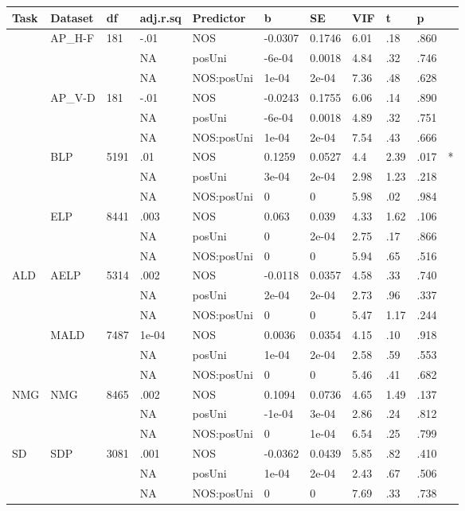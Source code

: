 \begin{table}[ht]
\centering
\begingroup\normalsize
\begin{tabular}{lllllllllll}
  \hline
Task & Dataset & df & adj.r.sq & Predictor & b & SE & VIF & t & p &  \\ 
  \hline
 & AP\_H-F & 181 & -.01 & NOS & -0.0307 & 0.1746 & 6.01 & .18 & .860 &   \\ 
   &  &  & NA & posUni & -6e-04 & 0.0018 & 4.84 & .32 & .746 &   \\ 
   &  &  & NA & NOS:posUni & 1e-04 & 2e-04 & 7.36 & .48 & .628 &   \\ 
   & AP\_V-D & 181 & -.01 & NOS & -0.0243 & 0.1755 & 6.06 & .14 & .890 &   \\ 
   &  &  & NA & posUni & -6e-04 & 0.0018 & 4.89 & .32 & .751 &   \\ 
   &  &  & NA & NOS:posUni & 1e-04 & 2e-04 & 7.54 & .43 & .666 &   \\ 
   & BLP & 5191 & .01 & NOS & 0.1259 & 0.0527 & 4.4 & 2.39 & .017 & * \\ 
   &  &  & NA & posUni & 3e-04 & 2e-04 & 2.98 & 1.23 & .218 &   \\ 
   &  &  & NA & NOS:posUni & 0 & 0 & 5.98 & .02 & .984 &   \\ 
   & ELP & 8441 & .003 & NOS & 0.063 & 0.039 & 4.33 & 1.62 & .106 &   \\ 
   &  &  & NA & posUni & 0 & 2e-04 & 2.75 & .17 & .866 &   \\ 
   &  &  & NA & NOS:posUni & 0 & 0 & 5.94 & .65 & .516 &   \\ 
  ALD & AELP & 5314 & .002 & NOS & -0.0118 & 0.0357 & 4.58 & .33 & .740 &   \\ 
   &  &  & NA & posUni & 2e-04 & 2e-04 & 2.73 & .96 & .337 &   \\ 
   &  &  & NA & NOS:posUni & 0 & 0 & 5.47 & 1.17 & .244 &   \\ 
   & MALD & 7487 & 1e-04 & NOS & 0.0036 & 0.0354 & 4.15 & .10 & .918 &   \\ 
   &  &  & NA & posUni & 1e-04 & 2e-04 & 2.58 & .59 & .553 &   \\ 
   &  &  & NA & NOS:posUni & 0 & 0 & 5.46 & .41 & .682 &   \\ 
  NMG & NMG & 8465 & .002 & NOS & 0.1094 & 0.0736 & 4.65 & 1.49 & .137 &   \\ 
   &  &  & NA & posUni & -1e-04 & 3e-04 & 2.86 & .24 & .812 &   \\ 
   &  &  & NA & NOS:posUni & 0 & 1e-04 & 6.54 & .25 & .799 &   \\ 
  SD & SDP & 3081 & .001 & NOS & -0.0362 & 0.0439 & 5.85 & .82 & .410 &   \\ 
   &  &  & NA & posUni & 1e-04 & 2e-04 & 2.43 & .67 & .506 &   \\ 
   &  &  & NA & NOS:posUni & 0 & 0 & 7.69 & .33 & .738 &   \\ 
   \hline
\end{tabular}
\endgroup
\end{table}
